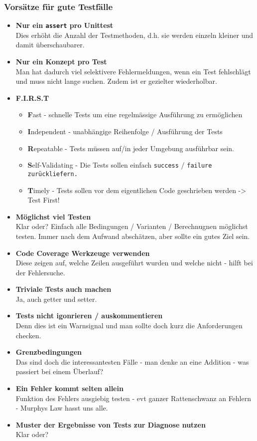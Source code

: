 \subsubsection{Vorsätze für gute Testfälle}
\begin{itemize}
  \item \textbf{Nur ein \texttt{assert} pro Unittest} \\
  Dies erhöht die Anzahl der Testmethoden, d.h. sie werden einzeln kleiner und damit überschaubarer. 
  \item \textbf{Nur ein Konzept pro Test} \\
  Man hat dadurch viel selektivere Fehlermeldungen, wenn ein Test fehlschlägt und muss nicht lange suchen. Zudem ist er gezielter wiederholbar.
  \item \textbf{F.I.R.S.T}
  \begin{itemize}
      \item \textbf{F}ast - schnelle Tests um eine regelmässige Ausführung zu ermöglichen
      \item \textbf{I}ndependent - unabhängige Reihenfolge / Ausführung der Tests
      \item \textbf{R}epeatable - Tests müssen auf/in jeder Umgebung ausführbar sein.
      \item \textbf{S}elf-Validating - Die Tests sollen einfach \texttt{success} / \texttt{failure zurückliefern.}
      \item \textbf{T}imely - Tests sollen vor dem eigentlichen Code geschrieben werden -> Test First!
  \end{itemize}
  \item \textbf{Möglichst viel Testen} \\
  Klar oder? Einfach alle Bedingungen / Varianten / Berechnugnen möglichst testen. Immer nach dem Aufwand abschätzen, aber sollte ein gutes Ziel sein.
  \item \textbf{Code Coverage Werkzeuge verwenden} \\
  Diese zeigen auf, welche Zeilen ausgeführt wurden und welche nicht - hilft bei der Fehlersuche.
  \item \textbf{Triviale Tests auch machen} \\
  Ja, auch getter und setter.
  \item \textbf{Tests nicht igonrieren / auskommentieren} \\
  Denn dies ist ein Warnsignal und man sollte doch kurz die Anforderungen checken.
  \item \textbf{Grenzbedingungen} \\
  Das sind doch die interessantesten Fälle - man denke an eine Addition - was passiert bei einem Überlauf?
  \item \textbf{Ein Fehler kommt selten allein} \\
  Funktion des Fehlers ausgiebig testen - evt ganzer Rattenschwanz an Fehlern - Murphys Law hasst uns alle.
  \item \textbf{Muster der Ergebnisse von Tests zur Diagnose nutzen} \\
  Klar oder?
\end{itemize}


